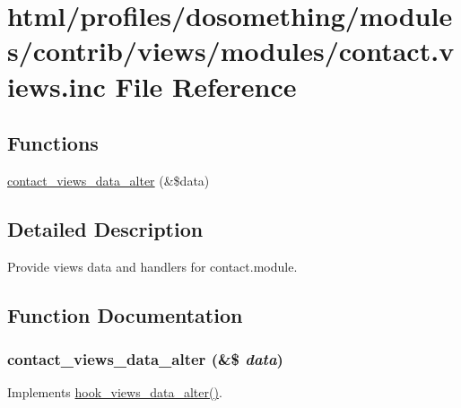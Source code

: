 \hypertarget{contact_8views_8inc}{
\section{html/profiles/dosomething/modules/contrib/views/modules/contact.views.inc File Reference}
\label{contact_8views_8inc}
}
\subsection*{Functions}
\begin{DoxyCompactItemize}
\item 
\hyperlink{contact_8views_8inc_a8d6248c129ede70e127420e9b8cf4a24}{contact\_\-views\_\-data\_\-alter} (\&\$data)
\end{DoxyCompactItemize}


\subsection{Detailed Description}
Provide views data and handlers for contact.module. 

\subsection{Function Documentation}
\hypertarget{contact_8views_8inc_a8d6248c129ede70e127420e9b8cf4a24}{
\subsubsection[{contact\_\-views\_\-data\_\-alter}]{\setlength{\rightskip}{0pt plus 5cm}contact\_\-views\_\-data\_\-alter (\&\$ {\em data})}}
\label{contact_8views_8inc_a8d6248c129ede70e127420e9b8cf4a24}
Implements \hyperlink{group__views__hooks_ga6ae0bb0d2385e03c32b57625b6d35826}{hook\_\-views\_\-data\_\-alter()}. 